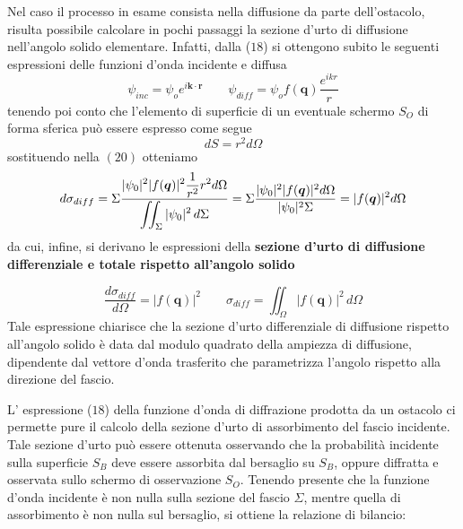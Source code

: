 Nel caso il processo in esame consista nella diffusione da parte dell'ostacolo, risulta possibile calcolare in pochi passaggi la sezione d'urto di diffusione nell'angolo solido elementare.
Infatti, dalla ($18$) si ottengono subito le seguenti espressioni delle funzioni d'onda incidente e diffusa \[
	\psi_{inc} = \psi_o e^{i \bm{k} \cdot \bm{r}} \qquad
	\psi_{diff} = \psi_o f(\bm{q})\frac{e^{ikr}}{r}
\] tenendo poi conto che l'elemento di superficie di un eventuale schermo $S_O$ di forma sferica può essere espresso come segue \[
	dS = r^2 d \Omega
\] sostituendo nella $(20)$ otteniamo \[
	d \sigma_{diff} = \Sigma \fraclarg{|\psi_0|^2|f(\bm{q})|^2\frac{1}{r^2}r^2 d \Omega}{\iint_{\Sigma}|\psi_0|^2 \, d \Sigma}
	= \Sigma \frac{|\psi_0|^2|f(\bm{q})|^2 d \Omega}{|\psi_0|^2 \Sigma}
	= |f(\bm{q})|^2 d \Omega
\]da cui, infine, si derivano le espressioni della \textbf{sezione d'urto di diffusione differenziale e totale rispetto all'angolo solido}

\begin{equation}
	\frac{d \sigma_{diff}}{d \Omega} = |f(\bm{q})|^2 \qquad
	\sigma_{diff} = \iint_{\Omega}|f(\bm{q})|^2 \, d \Omega
\end{equation} Tale espressione chiarisce che la sezione d'urto differenziale di diffusione rispetto all'angolo solido è data dal modulo quadrato della ampiezza di diffusione, dipendente dal vettore d'onda trasferito che parametrizza l'angolo rispetto alla direzione del fascio.

L' espressione ($18$) della funzione d'onda di diffrazione prodotta da un ostacolo ci permette pure il calcolo della sezione d'urto di assorbimento del fascio incidente.
Tale sezione d'urto può essere ottenuta osservando che la probabilità incidente sulla superficie $S_B$ deve essere assorbita dal bersaglio su $S_B$, oppure diffratta e osservata sullo schermo di osservazione $S_O$.
Tenendo presente che la funzione d'onda incidente è non nulla sulla sezione del fascio $\Sigma$, mentre quella di assorbimento è non nulla sul bersaglio, si ottiene la relazione di bilancio:

